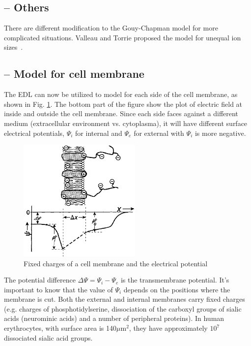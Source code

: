 \subsection{-- Others}
\label{sec:others}

There are different modification to the Gouy-Chapman model for more
complicated situations. Valleau and Torrie proposed the model for
unequal ion sizes~\citep{valleau1982edl}.

\subsection{-- Model for cell membrane}
\label{sec:model-cell-membrane}


The EDL can now be utilized to model for each side of the cell
membrane, as shown in Fig. \ref{fig:membrane-potential}. The bottom
part of the figure show the plot of electric field at inside and
outside the cell membrane. Since each side faces against a different
medium (extracellular environment vs. cytoplasma), it will have
different surface electrical potentials, $\Psi_i$ for internal and
$\Psi_e$ for external with $\Psi_i$ is more negative.

\begin{figure}[htb]
  \centerline{\includegraphics[height=6cm]{./images/cell-membrane_electrical-potential.eps}}
  \caption{Fixed charges of a cell membrane and the electrical
    potential}\label{fig:membrane-potential}
\end{figure}

The potential difference $\Delta \Psi = \Psi_i - \Psi_e$ is the transmembrane
potential. It's important to know that the value of $\Psi_i$ depends
on the positions where the membrane is cut. Both the external and
internal membranes carry fixed charges (e.g. charges of
phosphotidylserine, dissociation of the carboxyl groups of sialic
acids (neurominic acids) and a number of peripheral proteins). In
human erythrocytes, with surface area is 140$\mu$m$^2$, they have
approximately $10^7$ dissociated sialic acid groups.



